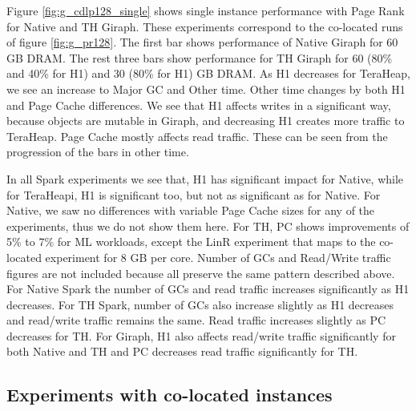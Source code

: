 Figure \ref{fig:g_cdlp128_single} shows single instance performance with Page Rank for Native and TH Giraph. These experiments correspond to the co-located runs of figure \ref{fig:g_pr128}. The first bar shows performance of Native Giraph for 60 GB DRAM. The rest three bars show performance for TH Giraph for 60 (80\% and 40\% for H1) and 30 (80\% for H1) GB DRAM. As H1 decreases for TeraHeap, we see an increase to Major GC  and Other time. Other time changes by both H1 and Page Cache differences. We see that H1 affects writes in a significant way, because objects are mutable in Giraph, and decreasing H1 creates more traffic to TeraHeap. Page Cache mostly affects read traffic. These can be seen from the progression of the bars in other time.

In all Spark experiments we see that, H1 has significant impact for Native, while for TeraHeapi, H1 is significant too, but not as significant as for Native. For Native, we saw no differences with variable Page Cache sizes for any of the experiments, thus we do not show them here. For TH, PC shows improvements of 5\% to 7\% for ML workloads, except the LinR experiment that maps to the co-located experiment for 8 GB per core. Number of GCs and Read/Write traffic figures are not included because all preserve the same pattern described above. For Native Spark the number of GCs and read traffic increases significantly as H1 decreases. For TH Spark, number of GCs also increase slightly as H1 decreases and read/write traffic remains the same. Read traffic increases slightly as PC decreases for TH. For Giraph, H1 also affects read/write traffic significantly for both Native and TH and PC decreases read traffic significantly for TH.

\subsection{Experiments with co-located instances}

